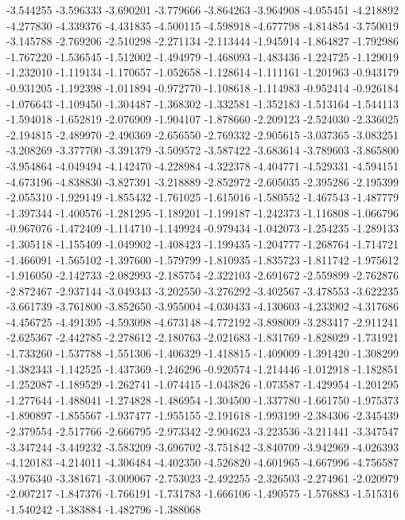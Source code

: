 -3.544255
-3.596333
-3.690201
-3.779666
-3.864263
-3.964908
-4.055451
-4.218892
-4.277830
-4.339376
-4.431835
-4.500115
-4.598918
-4.677798
-4.814854
-3.750019
-3.145788
-2.769206
-2.510298
-2.271134
-2.113444
-1.945914
-1.864827
-1.792986
-1.767220
-1.536545
-1.512002
-1.494979
-1.468093
-1.483436
-1.224725
-1.129019
-1.232010
-1.119134
-1.170657
-1.052658
-1.128614
-1.111161
-1.201963
-0.943179
-0.931205
-1.192398
-1.011894
-0.972770
-1.108618
-1.114983
-0.952414
-0.926184
-1.076643
-1.109450
-1.304487
-1.368302
-1.332581
-1.352183
-1.513164
-1.544113
-1.594018
-1.652819
-2.076909
-1.904107
-1.878660
-2.209123
-2.524030
-2.336025
-2.194815
-2.489970
-2.490369
-2.656550
-2.769332
-2.905615
-3.037365
-3.083251
-3.208269
-3.377700
-3.391379
-3.509572
-3.587422
-3.683614
-3.789603
-3.865800
-3.954864
-4.049494
-4.142470
-4.228984
-4.322378
-4.404771
-4.529331
-4.594151
-4.673196
-4.838830
-3.827391
-3.218889
-2.852972
-2.605035
-2.395286
-2.195399
-2.055310
-1.929149
-1.855432
-1.761025
-1.615016
-1.580552
-1.467543
-1.487779
-1.397344
-1.400576
-1.281295
-1.189201
-1.199187
-1.242373
-1.116808
-1.066796
-0.967076
-1.472409
-1.114710
-1.149924
-0.979434
-1.042073
-1.254235
-1.289133
-1.305118
-1.155409
-1.049902
-1.408423
-1.199435
-1.204777
-1.268764
-1.714721
-1.466091
-1.565102
-1.397600
-1.579799
-1.810935
-1.835723
-1.811742
-1.975612
-1.916050
-2.142733
-2.082993
-2.185754
-2.322103
-2.691672
-2.559899
-2.762876
-2.872467
-2.937144
-3.049343
-3.202550
-3.276292
-3.402567
-3.478553
-3.622235
-3.661739
-3.761800
-3.852650
-3.955004
-4.030433
-4.130603
-4.233902
-4.317686
-4.456725
-4.491395
-4.593098
-4.673148
-4.772192
-3.898009
-3.283417
-2.911241
-2.625367
-2.442785
-2.278612
-2.180763
-2.021683
-1.831769
-1.828029
-1.731921
-1.733260
-1.537788
-1.551306
-1.406329
-1.418815
-1.409009
-1.391420
-1.308299
-1.382343
-1.142525
-1.437369
-1.246296
-0.920574
-1.214446
-1.012918
-1.182851
-1.252087
-1.189529
-1.262741
-1.074415
-1.043826
-1.073587
-1.429954
-1.201295
-1.277644
-1.488041
-1.274828
-1.486954
-1.304500
-1.337780
-1.661750
-1.975373
-1.890897
-1.855567
-1.937477
-1.955155
-2.191618
-1.993199
-2.384306
-2.345439
-2.379554
-2.517766
-2.666795
-2.973342
-2.904623
-3.223536
-3.211441
-3.347547
-3.347244
-3.449232
-3.583209
-3.696702
-3.751842
-3.840709
-3.942969
-4.026393
-4.120183
-4.214011
-4.306484
-4.402350
-4.526820
-4.601965
-4.667996
-4.756587
-3.976340
-3.381671
-3.009067
-2.753023
-2.492255
-2.326503
-2.274961
-2.020979
-2.007217
-1.847376
-1.766191
-1.731783
-1.666106
-1.490575
-1.576883
-1.515316
-1.540242
-1.383884
-1.482796
-1.388068
